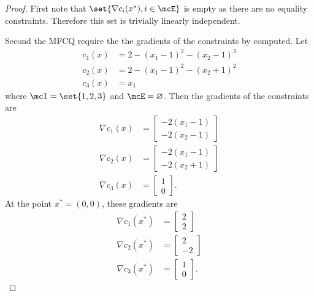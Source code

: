 \documentclass[11pt, oneside]{article}
\begin{document}
\begin{enumerate}
    \begin{proof}
      First note that $\set{\nabla c_i(x^*), i \in \mcE}$ is empty as there are
      no equality constraints.
      Therefore this set is trivially linearly independent.

      Second the MFCQ require the the gradients of the constraints by computed.
      Let
      \begin{align*}
        c_1(x) &= 2 - (x_1-1)^2 - (x_2-1)^2 \\
        c_2(x) &= 2 - (x_1-1)^2 - (x_2+1)^2 \\
        c_3(x) &= x_1
      \end{align*}
      where $\mcI = \set{1, 2, 3}$ and $\mcE = \varnothing$.
      Then the gradients of the constraints are
      \begin{align*}
        \nabla c_1(x) &=
        \begin{bmatrix}
          -2(x_1 - 1) \\
          -2(x_2 - 1)
        \end{bmatrix} \\
        \nabla c_2(x) &=
        \begin{bmatrix}
          -2(x_1 - 1) \\
          -2(x_2 + 1)
        \end{bmatrix} \\
        \nabla c_3(x) &=
        \begin{bmatrix}
          1 \\
          0
        \end{bmatrix}.
      \end{align*}
      At the point $x^* = (0, 0)$, these gradients are
      \begin{align*}
        \nabla c_1(x^*) &=
        \begin{bmatrix}
          2 \\
          2 
        \end{bmatrix} \\
        \nabla c_2(x^*) &=
        \begin{bmatrix}
          2 \\
          -2
        \end{bmatrix} \\
        \nabla c_3(x^*) &=
        \begin{bmatrix}
          1 \\
          0
        \end{bmatrix}.
      \end{align*}



\end{proof}
\end{enumerate}
\end{document}
